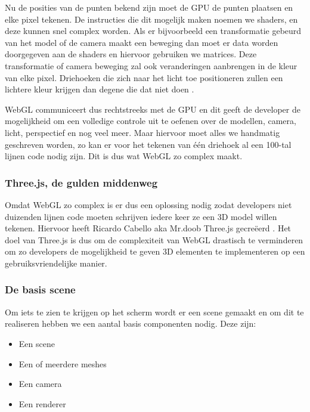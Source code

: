 Nu de posities van de punten bekend zijn moet de GPU de punten plaatsen en elke pixel tekenen. De instructies die dit mogelijk maken noemen we shaders, en deze kunnen snel complex worden. Als er bijvoorbeeld een transformatie gebeurd van het model of de camera maakt een beweging dan moet er data worden doorgegeven aan de shaders en hiervoor gebruiken we matrices. Deze transformatie of camera beweging zal ook veranderingen aanbrengen in de kleur van elke pixel. Driehoeken die zich naar het licht toe positioneren zullen een lichtere kleur krijgen dan degene die dat niet doen \autocite{Simon2023}.

WebGL communiceert dus rechtstreeks met de GPU en dit geeft de developer de mogelijkheid om een volledige controle uit te oefenen over de modellen, camera, licht, perspectief en nog veel meer. Maar hiervoor moet alles we handmatig geschreven worden, zo kan er voor het tekenen van één driehoek al een 100-tal lijnen code nodig zijn. Dit is dus wat WebGL zo complex maakt.

\subsubsection{Three.js, de gulden middenweg}

Omdat WebGL zo complex is er dus een oplossing nodig zodat developers niet duizenden lijnen code moeten schrijven iedere keer ze een 3D model willen tekenen. Hiervoor heeft Ricardo Cabello aka Mr.doob Three.js gecreëerd \autocite{Danchilla2012}. Het doel van Three.js is dus om de complexiteit van WebGL drastisch te verminderen om zo developers de mogelijkheid te geven 3D elementen te implementeren op een gebruiksvriendelijke manier.

\subsubsection{De basis scene}

Om iets te zien te krijgen op het scherm wordt er een scene gemaakt en om dit te realiseren hebben we een aantal basis componenten nodig. Deze zijn:  

\begin{itemize}
	\item Een scene
	\item Een of meerdere meshes
	\item Een camera
	\item Een renderer
\end{itemize}


